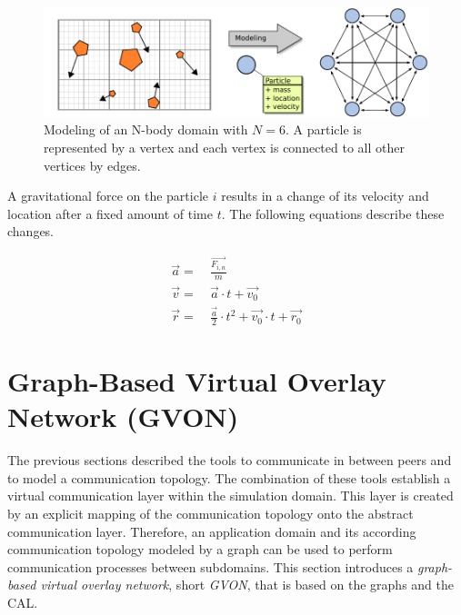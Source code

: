 \begin{figure}[H]
  \centering \includegraphics[width=\textwidth]{graphics/30_nbody_modeling}
  \caption{Modeling of an N-body domain with $N = 6$. A particle is
    represented by a vertex and each vertex is connected to all other
    vertices by edges.}
  \label{fig:nbody_modeling}
\end{figure}

\noindent A gravitational force on the particle $i$ results in a change of its velocity and
location after a fixed amount of time $t$. The following equations describe these
changes.

\begin{align}
  \label{eq:n_body_update}
  \overrightarrow{a} =&~ \frac{\overrightarrow{F_{i,n}}}{m}\\
  \overrightarrow{v} =&~ \overrightarrow{a} \cdot t + \overrightarrow{v_0}\\
  \overrightarrow{r} =&~ \frac{\overrightarrow{a}}{2} \cdot t^2 + \overrightarrow{v_0} \cdot t + \overrightarrow{r_0}
\end{align}


\section{Graph-Based Virtual Overlay Network (GVON)}
\label{sec:gvon}
The previous sections described the tools to communicate in between
peers and to model a communication topology. The combination of these
tools establish a virtual communication layer within the simulation
domain. This layer is created by an explicit mapping of the
communication topology onto the abstract communication
layer. Therefore, an application domain and its according
communication topology modeled by a graph can be used to perform
communication processes between subdomains.  This section introduces a
\textit{graph-based virtual overlay network}, short \textit{GVON},
that is based on the graphs and the CAL.

